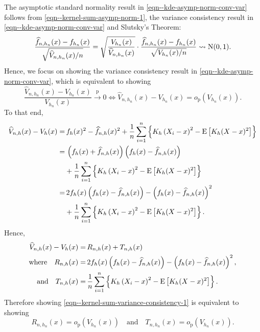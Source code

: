 The asymptotic standard normality result in
\eqref{eqn--kde-asymp-norm-conv-var}
follows from \eqref{eqn--kernel-sum-asymp-norm-1}, the variance consistency
result in \eqref{eqn--kde-asymp-norm-conv-var} and Slutsky's Theorem:
\begin{equation*}
  \frac{\widehat{f}_{n, h_{n}} (x) - f_{h_{n}} (x)}{\sqrt{\widehat{V}_{n, h_{n}}
  (x) / n}} = \sqrt{\frac{V_{h_{n}} (x)}{\widehat{V}_{n, h_{n}} (x)}} \cdot
  \frac{\widehat{f}_{n, h_{n}} (x) - f_{h_{n}} (x)}{\sqrt{V_{h_{n}} (x) / n}}
\rightsquigarrow \mathrm{N} (0, 1).
\end{equation*}
Hence, we focus on showing the variance consistency result in
\eqref{eqn--kde-asymp-norm-conv-var}, which is equivalent to showing
\begin{equation}
  \frac{\widehat{V}_{n, h_{n}} (x) - V_{h_{n}} (x)}{V_{h_{n}} (x)}
  \overset{\mathrm{p}}{\to} 0 \iff \widehat{V}_{n, h_{n}} (x) - V_{h_{n}} (x) =
  o_{\mathrm{p}} \left( V_{h_{n}} (x) \right).
  \label{eqn--kernel-sum-variance-consistency-1}
\end{equation}
To that end,
\begin{align*}
  \widehat{V}_{n, h} (x) - V_{h} (x) =
  & \, f_{h} (x)^{2} - \widehat{f}_{n, h} (x)^{2} + \frac{1}{n} \sum_{i = 1}^{n}
  \left\{ K_{h} \left( X_{i} - x \right)^{2} - \mathrm{E} \left[ K_{h} (X - x)^{2}
  \right] \right\} \\
  =
  & \, \left( f_{h} (x) + \widehat{f}_{n, h} (x) \right) \left( f_{h}
  (x) - \widehat{f}_{n, h} (x) \right) \\
  & + \frac{1}{n} \sum_{i = 1}^{n} \left\{ K_{h} \left( X_{i} - x \right)^{2} -
  \mathrm{E} \left[ K_{h} (X - x)^{2} \right] \right\} \\
  =
  & \, 2 f_{h} (x) \left( f_{h} (x) - \widehat{f}_{n, h} (x) \right) -
  \left( f_{h} (x) - \widehat{f}_{n, h} (x) \right)^{2} \\
  & + \frac{1}{n} \sum_{i = 1}^{n} \left\{ K_{h} \left( X_{i} - x \right)^{2} -
  \mathrm{E} \left[ K_{h} (X - x)^{2} \right] \right\}.
\end{align*}
Hence,
\begin{equation}
  \begin{split}
    \widehat{V}_{n, h} (x) - V_{h} (x) =
    & \, R_{n, h} (x) + T_{n, h} (x) \\
    \text{where} \quad
    R_{n, h} (x) =
    & \,  2 f_{h} (x) \left( f_{h} (x) - \widehat{f}_{n, h} (x) \right) -
    \left( f_{h} (x) - \widehat{f}_{n, h} (x) \right)^{2}, \\
    \text{and} \quad
    T_{n, h} (x) =
    & \, \frac{1}{n} \sum_{i = 1}^{n} \left\{ K_{h} \left( X_{i} - x \right)^{2}
    - \mathrm{E} \left[ K_{h} (X - x)^{2} \right] \right\}.
  \end{split}
\end{equation}
Therefore showing \eqref{eqn--kernel-sum-variance-consistency-1} is equivalent
to showing
\begin{equation}
  R_{n, h_{n}} (x) = o_{\mathrm{p}} \left( V_{h_{n}} (x) \right) \quad
  \text{and} \quad T_{n, h_{n}} (x) = o_{\mathrm{p}} \left( V_{h_{n}} (x)
  \right).
  \label{eqn--kernel-sum-variance-consistency-2}
\end{equation}

